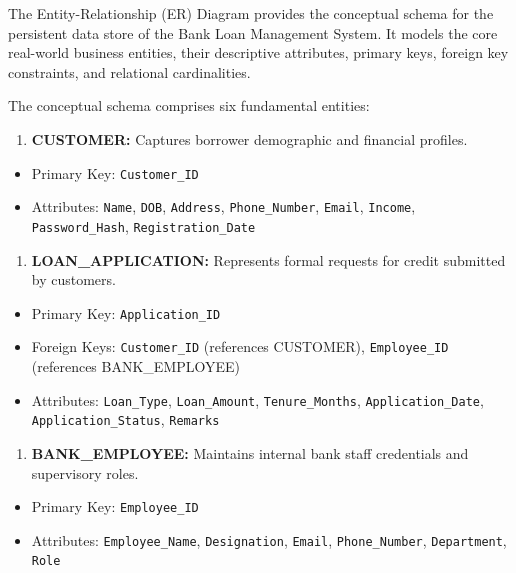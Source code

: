 The Entity-Relationship (ER) Diagram provides the conceptual schema for the persistent data store of the Bank Loan Management System. It models the core real-world business entities, their descriptive attributes, primary keys, foreign key constraints, and relational cardinalities.

The conceptual schema comprises six fundamental entities:

\begin{enumerate}
  \item \textbf{CUSTOMER:} Captures borrower demographic and financial profiles.
\end{enumerate}

\begin{itemize}
  \item Primary Key: \texttt{Customer\_ID}
  \item Attributes: \texttt{Name}, \texttt{DOB}, \texttt{Address}, \texttt{Phone\_Number}, \texttt{Email}, \texttt{Income}, \texttt{Password\_Hash}, \texttt{Registration\_Date}
\end{itemize}

\begin{enumerate}
  \item \textbf{LOAN\_APPLICATION:} Represents formal requests for credit submitted by customers.
\end{enumerate}

\begin{itemize}
  \item Primary Key: \texttt{Application\_ID}
  \item Foreign Keys: \texttt{Customer\_ID} (references CUSTOMER), \texttt{Employee\_ID} (references BANK\_EMPLOYEE)
  \item Attributes: \texttt{Loan\_Type}, \texttt{Loan\_Amount}, \texttt{Tenure\_Months}, \texttt{Application\_Date}, \texttt{Application\_Status}, \texttt{Remarks}
\end{itemize}

\begin{enumerate}
  \item \textbf{BANK\_EMPLOYEE:} Maintains internal bank staff credentials and supervisory roles.
\end{enumerate}

\begin{itemize}
  \item Primary Key: \texttt{Employee\_ID}
  \item Attributes: \texttt{Employee\_Name}, \texttt{Designation}, \texttt{Email}, \texttt{Phone\_Number}, \texttt{Department}, \texttt{Role}
\end{itemize}

